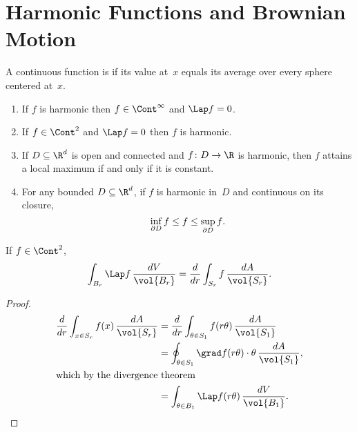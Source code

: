 \section	{Harmonic Functions and Brownian Motion}

\begin	{definition}
A continuous function is 
if its value at~$x$ equals its average over every sphere centered at~$x$.
\end	{definition}

\begin	{theorem}\leavevmode
\label	{thm:harmonic}
\begin	{enumerate}
\item	If $f$ is harmonic then \( f \in \Cont^\infty \) and \( \Lap f = 0 \).
\item	If \( f \in \Cont^2 \) and \( \Lap f = 0 \) then $f$ is harmonic.
\item	If \( D \subseteq \R^d \) is open and connected
	and \( f \colon D \to \R \) is harmonic,
	then $f$ attains a local maximum if and only if it is constant.
\item	For any bounded \( D \subseteq \R^d \),
	if $f$ is harmonic in~$D$ and continuous on its closure,
	\[ \inf_{\partial D} f \le f \le \sup_{\partial D} f \text. \]
\end	{enumerate}
\end	{theorem}

\begin	{proposition}
\label	{prop:mean-laplacian}
If \( f \in \Cont^2 \),
\[	\int_{B_r} \Lap f \,\frac{dV}{\vol{B_r}}
=	\frac{d}{dr} \int_{S_r} f \,\frac{dA}{\vol{S_r}}
\text. \]
\end	{proposition}
\begin	{proof}
\begin	{align*}
\frac{d}{dr} \int_{x \in S_r} f(x) \,\frac{dA}{\vol{S_r}}
&=	\frac{d}{dr} \int_{\theta \in S_1} f(r\theta) \,\frac{dA}{\vol{S_1}} \\
&=	\oint_{\theta \in S_1} \grad f(r\theta) \cdot \theta
		\,\frac{dA}{\vol{S_1}} \text, \\
\intertext{which by the divergence theorem}
&=	\int_{\theta \in B_1} \Lap f(r\theta) \,\frac{dV}{\vol{B_1}}
\text. \qedhere
\end	{align*}
\end	{proof}

